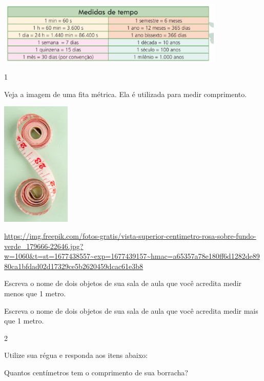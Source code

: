 \begin{escolha}
{\includegraphics[width=4.25870in,height=1.18344in]{media/image40.png}}


\num{1}

Veja a imagem de uma fita métrica. Ela é utilizada para medir
comprimento.

\includegraphics[width=1.29167in,height=2.33463in]{media/image41.png}

\url{https://img.freepik.com/fotos-gratis/vista-superior-centimetro-rosa-sobre-fundo-verde_179666-22646.jpg?w=1060\&t=st=1677438557~exp=1677439157~hmac=a65357a78e180ff6d1282de8980ca1bfdad02d17329ce5b2620459dcac61e3b8}

\begin{escolha}

\item
  Escreva o nome de dois objetos de sua sala de aula que você acredita
  medir menos que 1 metro.

\item
  Escreva o nome de dois objetos de sua sala de aula que você acredita
  medir mais que 1 metro.

\end{escolha}

\num{2}

Utilize sua régua e responda aos itens abaixo:

\begin{escolha}

\item
  Quantos centímetros tem o comprimento de sua borracha?


\end{escolha}
\end{escolha}
